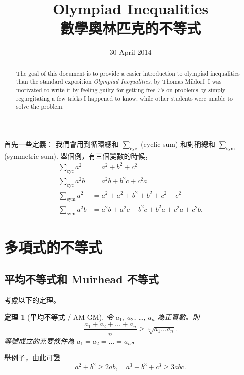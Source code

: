 \documentclass[11pt,nothm]{scrartcl}
\newtheorem{theorem}{\color{blue!40!black}定理}
\theoremstyle{definition}
\begin{document}
\title{Olympiad Inequalities \\ 數學奧林匹克的不等式}
\date{30 April 2014}
\maketitle

\begin{abstract}
  The goal of this document is to provide a easier introduction to olympiad
  inequalities than the standard exposition \emph{Olympiad Inequalities}, by Thomas Mildorf.
  I was motivated to write it by feeling guilty for getting free $7$'s on
  problems by simply regurgitating a few tricks I happened to know,
  while other students were unable to solve the problem.
\end{abstract}

首先一些定義： 我們會用到循環總和 $\sum_{\text{cyc}}$ (cyclic sum) 和對稱總和 $\sum_{\text{sym}}$ (symmetric sum).
舉個例，有三個變數的時候，
\begin{align*}
  \sum_{\text{cyc}} a^2 &= a^2+b^2+c^2 \\
  \sum_{\text{cyc}} a^2b &= a^2b+b^2c+c^2a \\
  \sum_{\text{sym}} a^2 &= a^2+a^2+b^2+b^2+c^2+c^2 \\
  \sum_{\text{sym}} a^2b &= a^2b+a^2c+b^2c+b^2a+c^2a+c^2b.
\end{align*}

\section{多項式的不等式}
\subsection{平均不等式和 Muirhead 不等式}
考慮以下的定理。
\begin{theorem}
  [平均不等式 / AM-GM] 令 $a_1$, $a_2$, \dots, $a_n$ 為正實數。則
  \[ \frac{a_1 + a_2 + \dots + a_n}{n} \ge \sqrt[n]{a_1 \dots a_n}. \]
  等號成立的充要條件為 $a_1 = a_2 = \dots = a_n$。
\end{theorem}
舉例子，由此可證 \[ a^2+b^2 \ge 2ab, \quad a^3+b^3+c^3 \ge 3abc. \]
\end{document}
